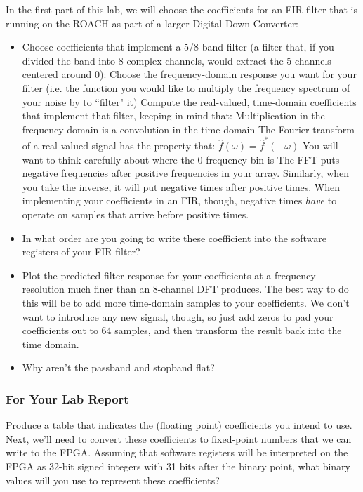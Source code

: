 \documentclass[11pt]{article}
\begin{document}
In the first part of this lab, we will choose the coefficients for an FIR filter that is running
on the ROACH as part of a larger Digital Down-Converter:
\begin{itemize}[noitemsep,nolistsep]
\item Choose coefficients that implement a 5/8-band filter (a filter that, if you divided the band into 8 complex
channels, would extract the 5 channels centered around 0):
\subitem Choose the frequency-domain response you want for your filter (i.e. the function you would like to multiply
the frequency spectrum of your noise by to ``filter" it)
\subitem Compute the real-valued, time-domain coefficients that implement that filter, keeping in mind that: 
\subsubitem Multiplication in the frequency domain is a convolution in the time domain
\subsubitem The Fourier transform of a real-valued signal has the property that:
$\hat f(\omega) = \hat f^*(-\omega)$
\subsubitem You will want to think carefully about where the 0 frequency bin is
\subsubitem The FFT puts negative frequencies after positive frequencies in your array.  Similarly, when you take the inverse, it will put negative times after positive times.  When implementing your coefficients in an FIR, though, negative times {\it have} to operate on samples that arrive before positive times.
\item In what order are you going to write these coefficient into the software registers of your FIR filter?
\item Plot the predicted filter response for your coefficients at a frequency resolution much finer than an 8-channel
DFT produces.  The best way to do this will be to add more time-domain samples to your coefficients.  We don't want to introduce any new signal, though, so just add zeros to pad your coefficients out to 64 samples, and then transform the result back into the time domain.  
\item Why aren't the passband and stopband flat?
\end{itemize}

\subsubsection{For Your Lab Report}

Produce a table that indicates the (floating point) coefficients you intend to
use.  Next, we'll need to convert these coefficients to fixed-point numbers
that we can write to the FPGA.  Assuming that software registers will be
interpreted on the FPGA as 32-bit signed integers with 31 bits after the binary
point, what binary values will you use to represent these coefficients?
\end{document}
